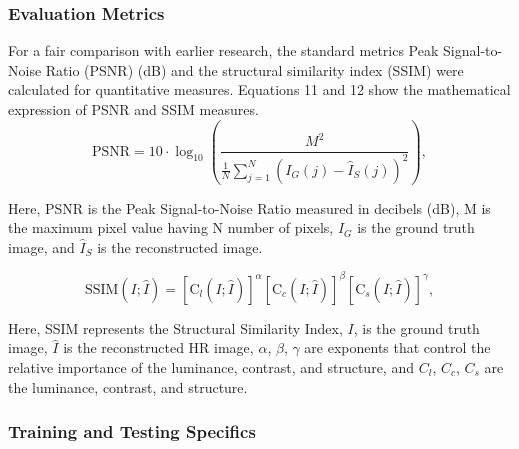 \documentclass[twocolumn]{svjour3}          %
\begin{document}
\subsubsection{Evaluation Metrics} 
For a fair comparison with earlier research, the standard metrics Peak Signal-to-Noise Ratio (PSNR) (dB) and the structural similarity index (SSIM) were calculated for quantitative measures. Equations 11 and 12 show the mathematical expression of PSNR and SSIM measures.
\begin{equation}
\text{PSNR} = 10 \cdot \log_{10}\left(\frac{M^2}{\frac{1}{N} \sum_{j=1}^{N} (I_{G}(j) - {\hat{I}_{S}}(j))^2}\right),
\end{equation}

Here, PSNR is the Peak Signal-to-Noise Ratio measured in decibels (dB), M is the maximum pixel value having N number of pixels, ${I_{G}}$ is the ground truth image, and ${\hat{I}_{S}}$ is the reconstructed image.

\begin{equation}
\text{SSIM}(I; \hat{I}) = \left[ \text{C}_{l}(I; \hat{I}) \right]^\alpha \left[ \text{C}_{c}(I; \hat{I}) \right]^\beta \left[ \text{C}_{s}(I; \hat{I}) \right]^\gamma,
\end{equation}

Here, SSIM represents the Structural Similarity Index, $I$, is the ground truth image, $\hat{I}$ is the reconstructed HR image, $\alpha$, $\beta$, $\gamma$ are exponents that control the relative importance of the luminance, contrast, and structure, and ${C}_{l}$, ${C}_{c}$, ${C}_{s}$ are the luminance, contrast, and structure.

\subsubsection{Training and Testing Specifics}
\end{document}
